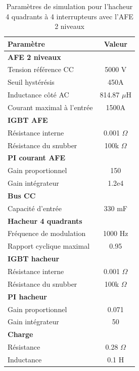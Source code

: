 \begin{table}[htb]
\centering
\begin{tabular}{|l|c|} 
  \hline
  \textbf{Paramètre} & \textbf{Valeur}  \\
  \hline\hline \hline
  \multicolumn{2}{|l|}{\textbf{AFE 2 niveaux}}\\ \hline \hline 
  Tension référence CC & 5000 V\\ \hline
  Seuil hystérésis & 450A\\ \hline
  Inductance côté AC& 814.87 $\mu$H\\ \hline
  Courant maximal à l'entrée& 1500A \\ \hline \hline
  \multicolumn{2}{|l|}{\textbf{IGBT AFE}}\\ \hline
  Résistance interne & 0.001 $\Omega$\\
  Résistance du snubber & 100k $\Omega$\\ \hline \hline
   \multicolumn{2}{|l|}{\textbf{PI courant AFE}}\\ \hline
  Gain proportionnel & 150 \\
  Gain intégrateur & 1.2e4 \\ \hline \hline
  \multicolumn{2}{|l|}{\textbf{Bus CC}}\\ \hline
  Capacité d'entrée & 330 mF\\
  \hline \hline \hline
  
  \multicolumn{2}{|l|}{\textbf{Hacheur 4 quadrants}}\\ \hline \hline
  Fréquence de modulation & 1000 Hz\\ \hline
  Rapport cyclique maximal & 0.95 \\ \hline \hline
  \multicolumn{2}{|l|}{\textbf{IGBT hacheur}}\\ \hline
  Résistance interne & 0.001 $\Omega$\\
  Résistance du snubber & 100k $\Omega$\\ \hline \hline
   \multicolumn{2}{|l|}{\textbf{PI hacheur}}\\ \hline
  Gain proportionnel & 0.071 \\
  Gain intégrateur & 50 \\ \hline \hline
  \multicolumn{2}{|l|}{\textbf{Charge}}\\ \hline
  Résistance & 0.28 $\Omega$\\
  Inductance & 0.1 H\\
  \hline
\end{tabular}
\caption{Paramètres de simulation pour l'hacheur 4 quadrants à 4 interrupteurs avec l'AFE 2 niveaux}
\label{p_AF_hash}
\end{table}
\clearpage

